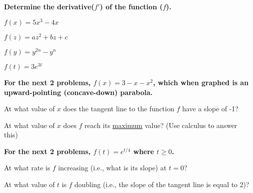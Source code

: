 \documentclass[addpoints]{exam}  %
\begin{document}
\noindent\textbf{Determine the derivative($f'$) of the function ($f$).}
\vspace{.2in}

\begin{questions}

    \question $f(x)=5x^3-4x$
    \vspace{1.5in}

    \question $f(z)=az^2+bz+c$
    \vspace{1.5in}

    \question $f(y)=y^{2n}-y^n$
    \vspace{1.5in}

    \question $f(t) = 3e^{3t}$
    \vspace{1.25in}

    \pagebreak

    \begin{adjustwidth}{-23pt}{0pt}
        \textbf{For the next 2 problems, $f(x)=3-x-x^2$, which when graphed is an upward-pointing (concave-down) parabola.}
    \end{adjustwidth}
    \vspace{.2in}

    \question At what value of $x$ does the tangent line to the function $f$ have a slope of -1?
    \vspace{1.2in}

    \question At what value of $x$ does $f$ reach its \underline{maximum} value?  (Use calculus to answer this)
    \vspace{1.2in}

    \begin{adjustwidth}{-23pt}{0pt}
        \textbf{For the next 2 problems, $f(t)=e^{t/4}$ where $t \geq 0$.}
    \end{adjustwidth}
    \vspace{.2in}

    \question At what rate is $f$ increasing (i.e., what is its slope) at $t=0$?
    \vspace{1.2in}

    \question At what value of $t$ is $f$ doubling (i.e., the slope of the tangent line is equal to 2)?
    \vspace{1.2in}

\end{questions}
\end{document}
